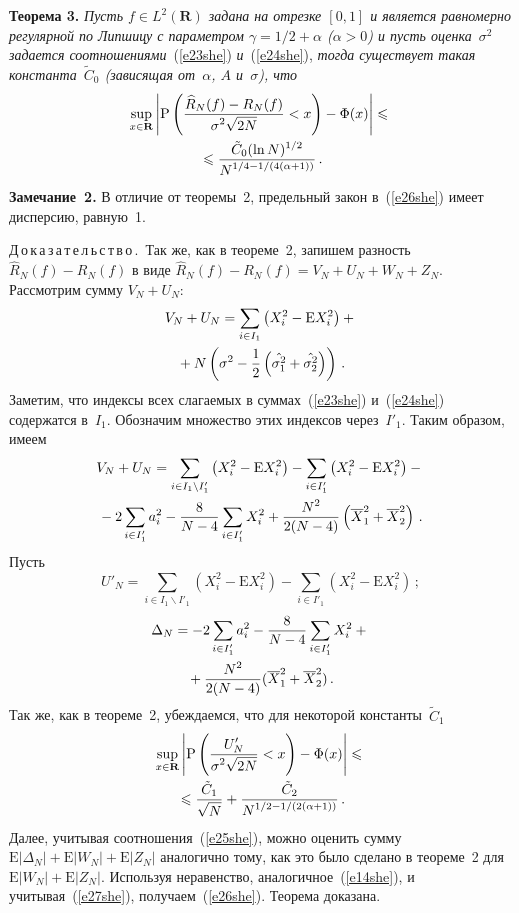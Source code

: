 \begin{multicols}{2}
\noindent
\textbf{Теорема 3.} \textit{Пусть $f\in L^2(\mathbf{R})$ задана на отрезке $[0,1]$ и является 
равномерно регулярной по Липшицу с параметром $\gamma=1/2+\alpha$ ($\alpha>0$) и пусть оценка~$\sigma^2$ 
задается соотношениями}~(\ref{e23she}) \textit{и}~(\ref{e24she}), 
\textit{тогда существует такая константа~$\tilde{C}_0$ (зависящая от~$\alpha$, $A$ и~$\sigma$), что
\begin{multline}
\sup\limits_{x\in\mathbf{R}}\left\vert\mbox{P}\left(\displaystyle\frac{\displaystyle \widehat{R}_N(f)-R_N(f)\mathstrut}{\displaystyle \sigma^2\sqrt{2N}\mathstrut}<x\right)-
\Phi(x)\right\vert\leqslant{}\\
{}\leqslant \displaystyle\frac{\displaystyle \tilde{C}_0(\ln N)^{1/2}\mathstrut}{\displaystyle N^{1/4-1/(4(\alpha+1))}\mathstrut}\,.
\label{e26she}
\end{multline}}
\textbf{Замечание~2.} В отличие от теоремы~2, предельный закон в~(\ref{e26she}) имеет дисперсию, равную~1.

\medskip

\noindent
Д\,о\,к\,а\,з\,а\,т\,е\,л\,ь\,с\,т\,в\,о\,.\ Так же, как в теореме~2, запишем разность $\widehat{R}_N(f)-R_N(f)$ в виде
$\widehat{R}_N(f)-R_N(f)=V_N+U_N+W_N+Z_N$. Рассмотрим сумму $V_N+U_N$:
\begin{multline*}
V_N+U_N=\sum_{i\in I_1}\left(X_i^2-\mbox{E}X_i^2\right)+{}\\
{}+N\left(\sigma^2-
\displaystyle\frac{\displaystyle 1\mathstrut}{\displaystyle 2\mathstrut}\left(\hat{\sigma_1^2}+\hat{\sigma_2^2}\right)\right)\,.
\end{multline*}
Заметим, что индексы всех слагаемых в суммах~(\ref{e23she}) и~(\ref{e24she}) содержатся в~$I_1$. 
Обозначим множество этих индексов через~$I'_1$. Таким образом, имеем
\begin{multline*}
V_N+U_N=\sum_{i\in I_1\backslash I'_1}\left(X_i^2-\mbox{E}X_i^2\right)-
\sum_{i\in I'_1}\left(X_i^2-\mbox{E}X_i^2\right)-{}\\
{}-2\sum_{i\in I'_1}a_i^2-\displaystyle\frac{\displaystyle 8\mathstrut}{\displaystyle N-4\mathstrut}\sum_{i\in I'_1}X_i^2+\displaystyle\frac{\displaystyle N^2\mathstrut}{\displaystyle 2(N-4)\mathstrut}\left(\overline{X}_1^2+\overline{X}_2^2\right)\,.
\end{multline*}
Пусть
$$
U'_N=\sum_{i\in I_1\backslash I'_1}\left(X_i^2-\mbox{E}X_i^2\right)-\sum_{i\in I'_1}\left(X_i^2-\mbox{E}X_i^2\right)\,;
$$
\begin{multline*}
\Delta_N=-2\sum_{i\in I'_1}a_i^2-\displaystyle\frac{\displaystyle 8\mathstrut}{\displaystyle N-4\mathstrut}\sum_{i\in I'_1}X_i^2+{}\\
{}+\displaystyle\frac{\displaystyle N^2\mathstrut}{\displaystyle 2(N-4)\mathstrut}(\overline{X}_1^2+\overline{X}_2^2)\,.
\end{multline*}
Так же, как в теореме~2, убеждаемся, что для некоторой константы~$\tilde{C}_1$
\begin{multline}
\sup\limits_{x\in\mathbf{R}}\left\vert\mbox{P}\left(\displaystyle\frac{\displaystyle U'_N\mathstrut}{\displaystyle \sigma^2\sqrt{2N}\mathstrut}<x\right)-\Phi(x)\right\vert\leqslant{}\\
{}\leqslant\displaystyle\frac{\displaystyle \tilde{C}_1\mathstrut}{\displaystyle \sqrt{N}\mathstrut}+\displaystyle\frac{\displaystyle \tilde{C}_2\mathstrut}{\displaystyle N^{1/2-1/(2(\alpha+1))}\mathstrut}\,.
\label{e27she}
\end{multline}
Далее, учитывая соотношения~(\ref{e25she}), можно оценить сумму 
$\mbox{E}|\Delta_N|+\mbox{E}|W_N|+\mbox{E}|Z_N|$ аналогично тому, как это было сделано в теореме~2 
для $\mbox{E}|W_N|+\mbox{E}|Z_N|$. Используя неравенство, аналогичное~(\ref{e14she}), 
и учитывая~(\ref{e27she}), получаем~(\ref{e26she}). Теорема доказана.


\end{multicols}
